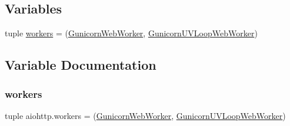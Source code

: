 \subsection*{Variables}
\begin{DoxyCompactItemize}
\item 
tuple \hyperlink{namespaceaiohttp_a6cf94f72e9495141fbdae4045b079753}{workers} = (\textquotesingle{}\hyperlink{classaiohttp_1_1worker_1_1_gunicorn_web_worker}{Gunicorn\+Web\+Worker}\textquotesingle{}, \textquotesingle{}\hyperlink{classaiohttp_1_1worker_1_1_gunicorn_u_v_loop_web_worker}{Gunicorn\+U\+V\+Loop\+Web\+Worker}\textquotesingle{})
\end{DoxyCompactItemize}


\subsection{Variable Documentation}
\mbox{\label{namespaceaiohttp_a6cf94f72e9495141fbdae4045b079753}} 
\subsubsection{\texorpdfstring{workers}{workers}}
{\footnotesize\ttfamily tuple aiohttp.\+workers = (\textquotesingle{}\hyperlink{classaiohttp_1_1worker_1_1_gunicorn_web_worker}{Gunicorn\+Web\+Worker}\textquotesingle{}, \textquotesingle{}\hyperlink{classaiohttp_1_1worker_1_1_gunicorn_u_v_loop_web_worker}{Gunicorn\+U\+V\+Loop\+Web\+Worker}\textquotesingle{})}

